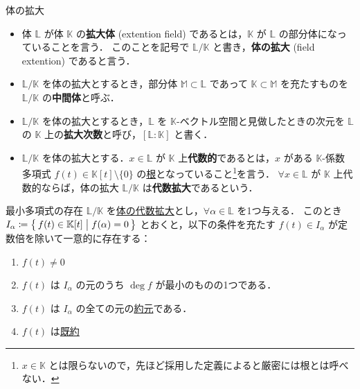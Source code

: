 \documentclass[rep_main]{subfiles}
\begin{document}
\begin{mydef}[label=def:field-extention]{体の拡大}
    \begin{itemize}
        \item 体 $\mathbb{L}$ が体 $\mathbb{K}$ の\textbf{拡大体} (extention field) であるとは，$\mathbb{K}$ が $\mathbb{L}$ の部分体になっていることを言う．
        このことを記号で $\bm{\mathbb{L}/\mathbb{K}}$ と書き，\textbf{体の拡大} (field extention) であると言う．
        \item $\mathbb{L} / \mathbb{K}$ を体の拡大とするとき，部分体 $\mathbb{M} \subset \mathbb{L}$ であって $\mathbb{K} \subset \mathbb{M}$ を充たすものを $\mathbb{L}/\mathbb{K}$ の\textbf{中間体}と呼ぶ．
        \item $\mathbb{L} / \mathbb{K}$ を体の拡大とするとき，$\mathbb{L}$ を $\mathbb{K}$-ベクトル空間と見做したときの次元を $\mathbb{L}$ の $\mathbb{K}$ 上の\textbf{拡大次数}と呼び，$\bm{[\mathbb{L}:\mathbb{K}]}$ と書く．
        \item $\mathbb{L} / \mathbb{K}$ を体の拡大とする．$x \in \mathbb{L}$ が $\mathbb{K}$ 上\textbf{代数的}であるとは，$x$ がある $\mathbb{K}$-係数多項式 $f(t) \in \mathbb{K}[t] \setminus \{0\}$ の\hyperref[def:poly-basic]{根}となっていること\footnote{$x \in \mathbb{K}$ とは限らないので，先ほど採用した定義によると厳密には根とは呼べない．}を言う．
        $\forall x \in \mathbb{L}$ が $\mathbb{K}$ 上代数的ならば，体の拡大 $\mathbb{L}/\mathbb{K}$ は\textbf{代数拡大}であるという．
    \end{itemize}
\end{mydef}

\begin{myprop}[label=prop:minimal-poly]{最小多項式の存在}
    $\mathbb{L}/\mathbb{K}$ を\hyperref[def:field-extention]{体の代数拡大}とし，$\forall \alpha \in \mathbb{L}$ を1つ与える．
    このとき $I_\alpha \coloneqq \bigl\{\, f(t) \in \mathbb{K}[t] \bigm| f(\alpha) = 0 \,\bigr\}$ とおくと，以下の条件を充たす $f(t) \in I_\alpha$ が定数倍を除いて一意的に存在する：
    \begin{enumerate}
        \item $f(t) \neq 0$
        \item $f(t)$ は $I_\alpha$ の元のうち $\deg f$ が最小のものの1つである．
        \item $f(t)$ は $I_\alpha$ の全ての元の\hyperref[def:domains]{約元}である．
        \item $f(t)$ は\hyperref[def:domain-basic]{既約}
    \end{enumerate}
\end{myprop}
\end{document}
